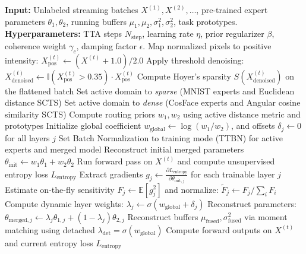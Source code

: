 \documentclass{article}
\theoremstyle{plain}
\theoremstyle{definition}
\theoremstyle{remark}
\begin{document}
\begin{algorithm}[htbp]
  \caption{BK-AHR: Test-Time Model Merging}
  \label{alg:bk_ahr}
  \begin{algorithmic}[1]
    \STATE \textbf{Input:} Unlabeled streaming batches $X^{(1)}, X^{(2)}, \dots$, pre-trained expert parameters $\theta_1, \theta_2$, running buffers $\mu_1, \mu_2, \sigma_1^2, \sigma_2^2$, task prototypes.
    \STATE \textbf{Hyperparameters:} TTA steps $N_{\mathrm{step}}$, learning rate $\eta$, prior regularizer $\beta$, coherence weight $\gamma_c$, damping factor $\epsilon$.
      \STATE Map normalized pixels to positive intensity: $X_{\mathrm{pos}}^{(t)} \leftarrow (X^{(t)} + 1.0) / 2.0$
      \STATE Apply threshold denoising: $X_{\mathrm{denoised}}^{(t)} \leftarrow \mathbb{I}(X_{\mathrm{pos}}^{(t)} > 0.35) \cdot X_{\mathrm{pos}}^{(t)}$
      \STATE Compute Hoyer's sparsity $S(X_{\mathrm{denoised}}^{(t)})$ on the flattened batch
        \STATE Set active domain to \textit{sparse} (MNIST experts and Euclidean distance SCTS)
      \ELSE
        \STATE Set active domain to \textit{dense} (CosFace experts and Angular cosine similarity SCTS)
      \ENDIF
      \STATE Compute routing priors $w_1, w_2$ using active distance metric and prototypes
      \STATE Initialize global coefficient $w_{\mathrm{global}} \leftarrow \log(w_1 / w_2)$, and offsets $\delta_j \leftarrow 0$ for all layers $j$
      \STATE Set Batch Normalization to training mode (TTBN) for active experts and merged model
      \STATE Reconstruct initial merged parameters $\theta_{\mathrm{init}} \leftarrow w_1 \theta_1 + w_2 \theta_2$
      \STATE Run forward pass on $X^{(t)}$ and compute unsupervised entropy loss $L_{\mathrm{entropy}}$
      \STATE Extract gradients $g_j \leftarrow \frac{\partial L_{\mathrm{entropy}}}{\partial \theta_{\mathrm{init}, j}}$ for each trainable layer $j$
      \STATE Estimate on-the-fly sensitivity $F_j \leftarrow \mathbb{E}[g_j^2]$ and normalize: $\tilde{F}_j \leftarrow F_j / \sum_i F_i$
        \STATE Compute dynamic layer weights: $\lambda_j \leftarrow \sigma(w_{\mathrm{global}} + \delta_j)$
        \STATE Reconstruct parameters: $\theta_{\mathrm{merged}, j} \leftarrow \lambda_j \theta_{1, j} + (1 - \lambda_j) \theta_{2, j}$
        \STATE Reconstruct buffers $\mu_{\mathrm{fused}}, \sigma_{\mathrm{fused}}^2$ via moment matching using detached $\lambda_{\mathrm{det}} = \sigma(w_{\mathrm{global}})$
        \STATE Compute forward outputs on $X^{(t)}$ and current entropy loss $L_{\mathrm{entropy}}$

\end{algorithmic}
\end{algorithm}
\end{document}
